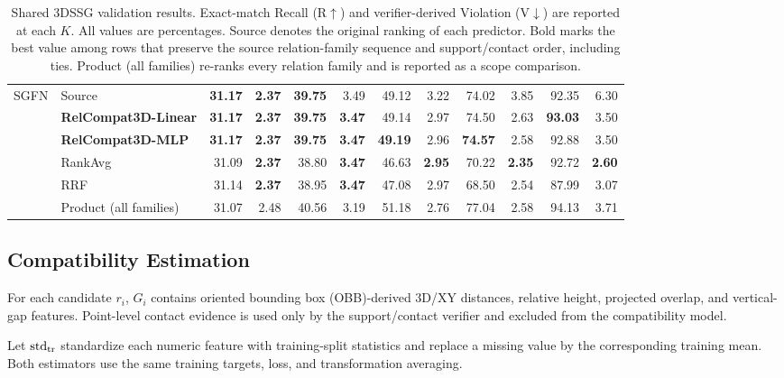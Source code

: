 \begin{table}[!t]
{\begin{tabular}{@{}llrrrrrrrrrr@{}}
    \midrule
    \multirow{6}{*}{SGFN}
    & Source & \textbf{31.17} & \textbf{2.37} & \textbf{39.75} & 3.49 & 49.12 & 3.22 & 74.02 & 3.85 & 92.35 & 6.30 \\
    & \textbf{RelCompat3D-Linear} & \textbf{31.17} & \textbf{2.37} & \textbf{39.75} & \textbf{3.47} & 49.14 & 2.97 & 74.50 & 2.63 & \textbf{93.03} & 3.50 \\
    & \textbf{RelCompat3D-MLP} & \textbf{31.17} & \textbf{2.37} & \textbf{39.75} & \textbf{3.47} & \textbf{49.19} & 2.96 & \textbf{74.57} & 2.58 & 92.88 & 3.50 \\
    & RankAvg & 31.09 & \textbf{2.37} & 38.80 & \textbf{3.47} & 46.63 & \textbf{2.95} & 70.22 & \textbf{2.35} & 92.72 & \textbf{2.60} \\
    & RRF & 31.14 & \textbf{2.37} & 38.95 & \textbf{3.47} & 47.08 & 2.97 & 68.50 & 2.54 & 87.99 & 3.07 \\
    & Product (all families) & 31.07 & 2.48 & 40.56 & 3.19 & 51.18 & 2.76 & 77.04 & 2.58 & 94.13 & 3.71 \\
    \bottomrule
    \end{tabular}
    }
    \caption{Shared 3DSSG validation results. Exact-match Recall (R$\uparrow$) and verifier-derived Violation (V$\downarrow$) are reported at each $K$. All values are percentages. Source denotes the original ranking of each predictor. Bold marks the best value among rows that preserve the source relation-family sequence and support/contact order, including ties. Product (all families) re-ranks every relation family and is reported as a scope comparison.}
    \label{tab:main-results}
\end{table}

\subsection{Compatibility Estimation}
\label{sec:Compatibility}
For each candidate $r_i$, $G_i$ contains oriented bounding box (OBB)-derived 3D/XY distances, relative height, projected overlap, and vertical-gap features. Point-level contact evidence is used only by the support/contact verifier and excluded from the compatibility model.

Let $\operatorname{std}_{\rm tr}$ standardize each numeric feature with training-split statistics and replace a missing value by the corresponding training mean. Both estimators use the same training targets, loss, and transformation averaging.

